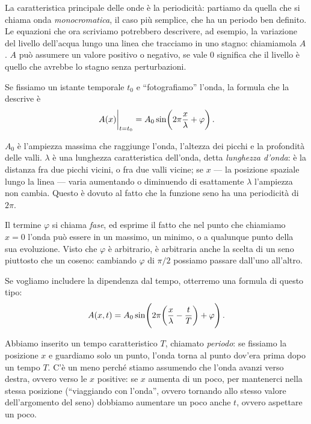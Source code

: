 \documentclass{article}
\begin{document}
La caratteristica principale delle onde è la periodicità: partiamo da quella che si chiama onda \emph{monocromatica}, il caso più semplice, che ha un periodo ben definito.
Le equazioni che ora scriviamo potrebbero descrivere, ad esempio, la variazione del livello dell'acqua lungo una linea che tracciamo in uno stagno: chiamiamola \(A\).
\(A\) può assumere un valore positivo o negativo, se vale 0 significa che il livello è quello che avrebbe lo stagno senza perturbazioni.

Se fissiamo un istante temporale \(t_0 \) e ``fotografiamo'' l'onda, la formula che la descrive è 
%
\begin{align}
\eval{A(x)}_{t = t_0 } = A_0 \sin(2 \pi \frac{x}{\lambda } +\varphi )
\,.
\end{align}

\(A_0 \) è l'ampiezza massima che raggiunge l'onda, l'altezza dei picchi e la profondità delle valli. \(\lambda \) è una lunghezza caratteristica dell'onda, detta \emph{lunghezza d'onda}: è la distanza fra due picchi vicini, o fra due valli vicine; se \(x\) --- la posizione spaziale lungo la linea --- varia aumentando o diminuendo di esattamente \(\lambda\) l'ampiezza non cambia.
Questo è dovuto al fatto che la funzione seno ha una periodicità di \(2 \pi \). 

Il termine \(\varphi \) si chiama \emph{fase}, ed esprime il fatto che nel punto che chiamiamo \(x=0\) l'onda può essere in un massimo, un minimo, o a qualunque punto della sua evoluzione. 
Visto che \(\varphi \) è arbitrario, è arbitraria anche la scelta di un seno piuttosto che un coseno: cambiando \(\varphi \) di \(\pi /2\) possiamo passare dall'uno all'altro. 

Se vogliamo includere la dipendenza dal tempo, otterremo una formula di questo tipo: 
%
\begin{align}
A(x, t) = A_0 \sin(2 \pi \qty( \frac{x}{\lambda } - \frac{t}{T}) + \varphi )
\,.
\end{align}

Abbiamo inserito un tempo caratteristico \(T\), chiamato \emph{periodo}: se fissiamo la posizione \(x\) e guardiamo solo un punto, l'onda torna al punto dov'era prima dopo un tempo \(T\). 
C'è un meno perché stiamo assumendo che l'onda avanzi verso destra, ovvero verso le \(x\) positive: se \(x\) aumenta di un poco, per mantenerci nella stessa posizione (``viaggiando con l'onda'', ovvero tornando allo stesso valore dell'argomento del seno) dobbiamo aumentare un poco anche \(t\), ovvero aspettare un poco. 
\end{document}
